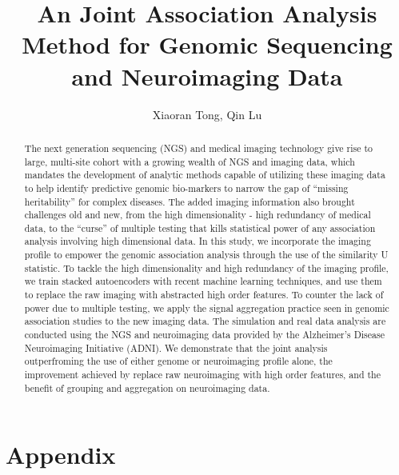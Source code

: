 \documentclass[12pt]{article}
\author{Xiaoran Tong, Qin Lu}
\begin{document}
\title{An Joint Association Analysis Method for Genomic Sequencing and Neuroimaging Data}
\maketitle

\begin{abstract}
The next generation sequencing (NGS) and medical imaging technology give rise to large, multi-site cohort with a growing wealth of NGS and imaging data, which mandates the development of analytic methods capable of utilizing these imaging data to help identify predictive genomic bio-markers to narrow the gap of ``missing heritability'' for complex diseases. The added imaging information also brought challenges old and new, from the high dimensionality - high redundancy of medical data, to the ``curse'' of multiple testing that kills statistical power of any association analysis involving high dimensional data. In this study, we incorporate the imaging profile to empower the genomic association analysis through the use of the similarity U statistic. To tackle the high dimensionality and high redundancy of the imaging profile, we train stacked autoencoders with recent machine learning techniques, and use them to replace the raw imaging with abstracted high order features. To counter the lack of power due to multiple testing, we apply the signal aggregation practice seen in genomic association studies to the new imaging data.
The simulation and real data analysis are conducted using the NGS and neuroimaging data provided by the Alzheimer’s Disease Neuroimaging Initiative (ADNI). We demonstrate that the joint analysis outperfroming the use of either genome or neuroimaging profile alone, the improvement achieved by replace raw neuroimaging with high order features, and the benefit of grouping and aggregation on neuroimaging data.
\end{abstract}
%




%
\printbibliography{}
\section{Appendix}
%

%
\end{document}
